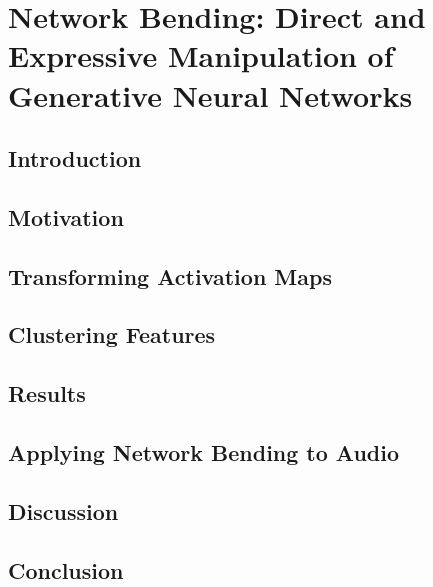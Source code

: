 \chapter{Network Bending: Direct and Expressive Manipulation of Generative Neural Networks}
\label{ch:net_bend}

\section{Introduction}

\section{Motivation}

\section{Transforming Activation Maps}

\section{Clustering Features}

\section{Results}

\section{Applying Network Bending to Audio}

\section{Discussion}

\section{Conclusion}

